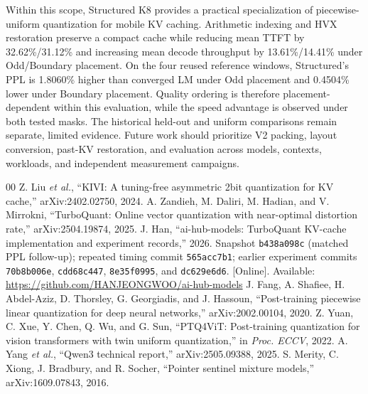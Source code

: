 \documentclass[conference,a4paper,10pt]{IEEEtran}
\begin{document}
Within this scope, Structured K8 provides a practical specialization of piecewise-uniform quantization for mobile KV caching. Arithmetic indexing and HVX restoration preserve a compact cache while reducing mean TTFT by 32.62\%/31.12\% and increasing mean decode throughput by 13.61\%/14.41\% under Odd/Boundary placement. On the four reused reference windows, Structured's PPL is 1.8060\% higher than converged LM under Odd placement and 0.4504\% lower under Boundary placement. Quality ordering is therefore placement-dependent within this evaluation, while the speed advantage is observed under both tested masks. The historical held-out and uniform comparisons remain separate, limited evidence. Future work should prioritize V2 packing, layout conversion, past-KV restoration, and evaluation across models, contexts, workloads, and independent measurement campaigns.

\begin{thebibliography}{00}
 Z. Liu \emph{et al.}, ``KIVI: A tuning-free asymmetric 2bit quantization for KV cache,'' arXiv:2402.02750, 2024.
 A. Zandieh, M. Daliri, M. Hadian, and V. Mirrokni, ``TurboQuant: Online vector quantization with near-optimal distortion rate,'' arXiv:2504.19874, 2025.
 J. Han, ``ai-hub-models: TurboQuant KV-cache implementation and experiment records,'' 2026. Snapshot \texttt{b438a098c} (matched PPL follow-up); repeated timing commit \texttt{565acc7b1}; earlier experiment commits \texttt{70b8b006e}, \texttt{cdd68c447}, \texttt{8e35f0995}, and \texttt{dc629e6d6}. [Online]. Available: \url{https://github.com/HANJEONGWOO/ai-hub-models}
 J. Fang, A. Shafiee, H. Abdel-Aziz, D. Thorsley, G. Georgiadis, and J. Hassoun, ``Post-training piecewise linear quantization for deep neural networks,'' arXiv:2002.00104, 2020.
 Z. Yuan, C. Xue, Y. Chen, Q. Wu, and G. Sun, ``PTQ4ViT: Post-training quantization for vision transformers with twin uniform quantization,'' in \emph{Proc. ECCV}, 2022.
 A. Yang \emph{et al.}, ``Qwen3 technical report,'' arXiv:2505.09388, 2025.
 S. Merity, C. Xiong, J. Bradbury, and R. Socher, ``Pointer sentinel mixture models,'' arXiv:1609.07843, 2016.
\end{thebibliography}
\end{document}

